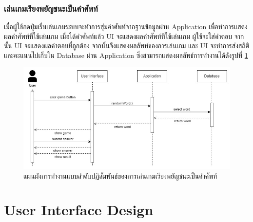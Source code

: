 \documentclass[12pt,oneside,openright,a4paper]{cpe-thai-project}
\begin{document}
\subsubsection{เล่นเกมเรียงพยัญชนะเป็นคำศัพท์}
\hspace{1cm}
เมื่อผู้ใช้กดปุ่มเริ่มเล่นเกมระบบจะทำการสุ่มคำศัพท์จากฐานข้อมูลผ่าน Application เพื่อทำการแสดงผลคำศัพท์ที่ใช้เล่นเกม เมื่อได้คำศัพท์แล้ว
UI จะแสดงผลคำศัพท์ที่ใช้เล่นเกม ผู้ใช้จะใส่คำตอบ จากนั้น UI จะแสดงผลคำตอบที่ถูกต้อง จากนั้นจึงแสดงผลลัพท์ของการเล่นเกม
และ UI จะทำการส่งสถิติและคะแนนไปเก็บใน Database ผ่าน Application ซึ่งสามารถแสดงผลลัพธ์การทำงานได้ดังรูปที่ \ref{fig:S_Game}
\begin{figure}[!h]\centering
	\includegraphics[width=\textwidth, keepaspectratio=true]{image/chap3/sequence/Game.jpg}
	\caption{แผนผังการทำงานแบบลำดับปฏิสัมพันธ์ของการเล่นเกมเรียงพยัญชนะเป็นคำศัพท์}\label{fig:S_Game}
\end{figure}

\pagebreak
\section{User Interface Design} \label{ssec:UI}
\end{document}

